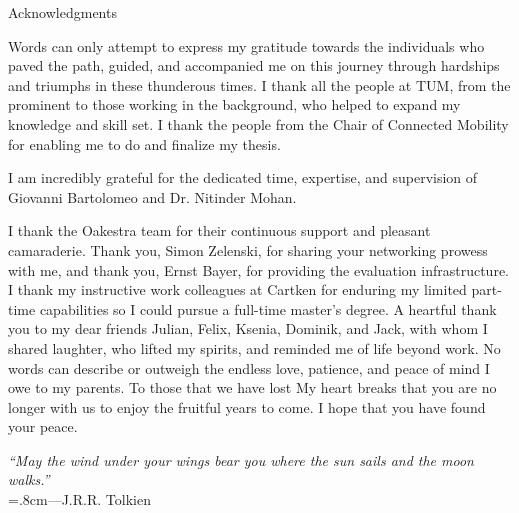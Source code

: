 \thispagestyle{empty}

\vspace*{20mm}

\begin{center}
    { Acknowledgments}
\end{center}

\vspace{10mm}


Words can only attempt to express my gratitude towards the individuals who paved the path, guided, and accompanied me on this journey through hardships and triumphs in these thunderous times.
\vspace{5mm}\newline
I thank all the people at TUM, from the prominent to those working in the background, who helped to expand my knowledge and skill set.
I thank the people from the Chair of Connected Mobility for enabling me to do and finalize my thesis.

I am incredibly grateful for the dedicated time, expertise, and supervision of Giovanni Bartolomeo and Dr. Nitinder Mohan.

I thank the Oakestra team for their continuous support and pleasant camaraderie.
Thank you, Simon Zelenski, for sharing your networking prowess with me, and thank you, Ernst Bayer, for providing the evaluation infrastructure.
\vspace{5mm}\newline
I thank my instructive work colleagues at Cartken for enduring my limited part-time capabilities so I could pursue a full-time master's degree.
\vspace{5mm}\newline
A heartful thank you to my dear friends Julian, Felix, Ksenia, Dominik, and Jack, with whom I shared laughter, who lifted my spirits, and reminded me of life beyond work.
\vspace{5mm}\newline
No words can describe or outweigh the endless love, patience, and peace of mind I owe to my parents.
\vspace{5mm}\newline
To those that we have lost \newline
My heart breaks that you are no longer with us to enjoy the fruitful years to come. \newline
I hope that you have found your peace.

\vspace{10mm}
\begin{flushright}
    \centering
    \rightskip=1.8cm\textit{``May the wind under your wings bear you where the sun sails and the moon walks.''} \\
    \vspace{.2em}
    \rightskip=.8cm---J.R.R. Tolkien
\end{flushright}
\vspace{1em}

\cleardoublepage{}
